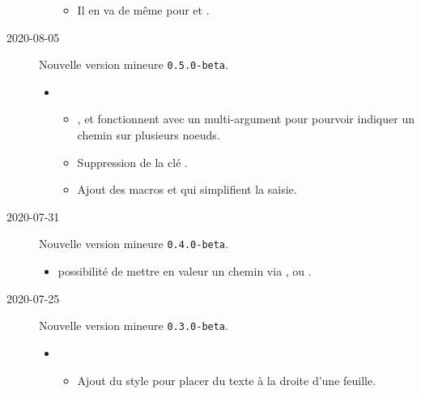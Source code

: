 \documentclass[12pt,a4paper]{article}
\begin{document}
\begin{description}
\begin{itemize}[itemsep=.5em]
\begin{itemize}[itemsep=.5em]
            \item Il en va de même pour  et .
        \end{itemize}
    \end{itemize}
    
    
    \separation

    \medskip
    \item[2020-08-05] Nouvelle version mineure \verb+0.5.0-beta+.
    
    \begin{itemize}[itemsep=.5em]
        \item {}
        \begin{itemize}[itemsep=.5em]
            \item {},  et  fonctionnent avec un multi-argument pour pourvoir indiquer un chemin sur plusieurs noeuds.
            
            \item Suppression de la clé .
            
            \item Ajout des macros  et  qui simplifient la saisie.
        \end{itemize}
    \end{itemize}
    
    \separation


    \medskip
    \item[2020-07-31] Nouvelle version mineure \verb+0.4.0-beta+.
    
    \begin{itemize}[itemsep=.5em]
        \item {}
        	  possibilité de mettre en valeur un chemin via ,   ou .
    \end{itemize}
    
    \separation

    \medskip
    \item[2020-07-25] Nouvelle version mineure \verb+0.3.0-beta+.
    
    \begin{itemize}[itemsep=.5em]
        \item {}
        \begin{itemize}[itemsep=.5em]
            \item Ajout du style  pour placer du texte à la droite d'une feuille.
    

\end{itemize}
\end{itemize}
\end{description}
\end{document}
